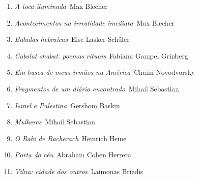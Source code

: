 \vspace{-5mm}


\vspace{-5mm}

\begin{enumerate}
\setlength{\topsep}{2pt}
\setlength{\partopsep}{0pt}
\setlength\parskip{4.2pt}
\setlength\itemsep{-1.4mm}
\item \textit{A toca iluminada}\, Max Blecher
\item \textit{Acontecimentos na irrealidade imediata}\, Max Blecher
\item \textit{Baladas hebraicas}\, Else Lasker-Schüler
\item \textit{Cabalat shabat: poemas rituais}\, Fabiana Gampel Grinberg
\item \textit{Em busca de meus irmãos na América}\, Chaim Novodvorsky
\item \textit{Fragmentos de um diário encontrado}\, Mihail Sebastian
\item \textit{Israel e Palestina}\, Gershom Baskin
\item \textit{Mulheres}\, Mihail Sebastian
\item \textit{O Rabi de Bacherach}\, Heinrich Heine
\item \textit{Porta do céu}\, Abraham Cohen Herrera
\item \textit{Vilna: cidade dos outros}\, Laimonas Briedis
\end{enumerate}

\vspace{-5mm}




